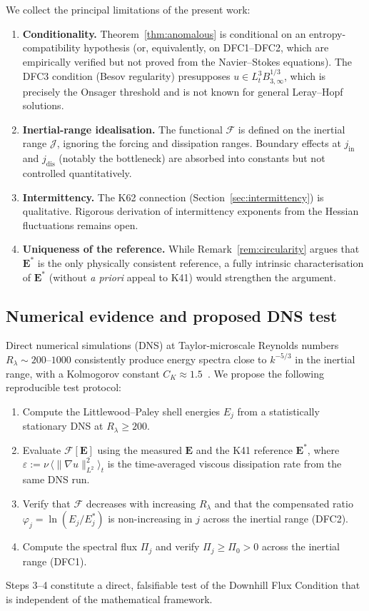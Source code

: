 \documentclass[12pt,a4paper]{article}
\theoremstyle{definition}
\theoremstyle{plain}
\theoremstyle{remark}
\begin{document}
We collect the principal limitations of the present work:
\begin{enumerate}
\item \textbf{Conditionality.}\; Theorem~\ref{thm:anomalous} is conditional
  on an entropy-compatibility hypothesis (or, equivalently, on DFC1--DFC2,
  which are empirically verified but not proved from the Navier--Stokes
  equations).  The DFC3 condition (Besov regularity) presupposes
  $u \in L^3_t B^{1/3}_{3,\infty}$, which is precisely the Onsager
  threshold and is not known for general Leray--Hopf solutions.
\item \textbf{Inertial-range idealisation.}\; The functional $\mathcal{F}$
  is defined on the inertial range $\mathcal{J}$, ignoring the forcing
  and dissipation ranges.  Boundary effects at $j_{\mathrm{in}}$ and
  $j_{\mathrm{dis}}$ (notably the bottleneck) are absorbed into constants
  but not controlled quantitatively.
\item \textbf{Intermittency.}\; The K62 connection (Section~\ref{sec:intermittency})
  is qualitative.  Rigorous derivation of intermittency exponents from
  the Hessian fluctuations remains open.
\item \textbf{Uniqueness of the reference.}\; While Remark~\ref{rem:circularity}
  argues that $\mathbf{E}^*$ is the only physically consistent reference,
  a fully intrinsic characterisation of $\mathbf{E}^*$ (without
  \emph{a priori} appeal to K41) would strengthen the argument.
\end{enumerate}

\subsection{Numerical evidence and proposed DNS test}

Direct numerical simulations (DNS) at Taylor-microscale Reynolds numbers
$R_\lambda \sim 200$--$1000$ consistently produce energy spectra close to
$k^{-5/3}$ in the inertial range, with a Kolmogorov constant
$C_K \approx 1.5$~\cite{ES06,Frisch95,MY75}.  We propose the following
reproducible test protocol:
\begin{enumerate}
\item Compute the Littlewood--Paley shell energies $E_j$ from
  a statistically stationary DNS at $R_\lambda \ge 200$.
\item Evaluate $\mathcal{F}[\mathbf{E}]$ using the measured
  $\mathbf{E}$ and the K41 reference $\mathbf{E}^*$, where
  $\varepsilon := \nu\,\langle\|\nabla u\|_{L^2}^2\rangle_t$
  is the time-averaged viscous dissipation rate from the same DNS run.
\item Verify that $\mathcal{F}$ decreases with increasing $R_\lambda$
  and that the compensated ratio $\varphi_j = \ln(E_j/E_j^*)$ is
  non-increasing in $j$ across the inertial range (DFC2).
\item Compute the spectral flux $\Pi_j$ and verify $\Pi_j \ge \Pi_0 > 0$
  across the inertial range (DFC1).
\end{enumerate}
Steps 3--4 constitute a direct, falsifiable test of the Downhill Flux
Condition that is independent of the mathematical framework.
\end{document}
